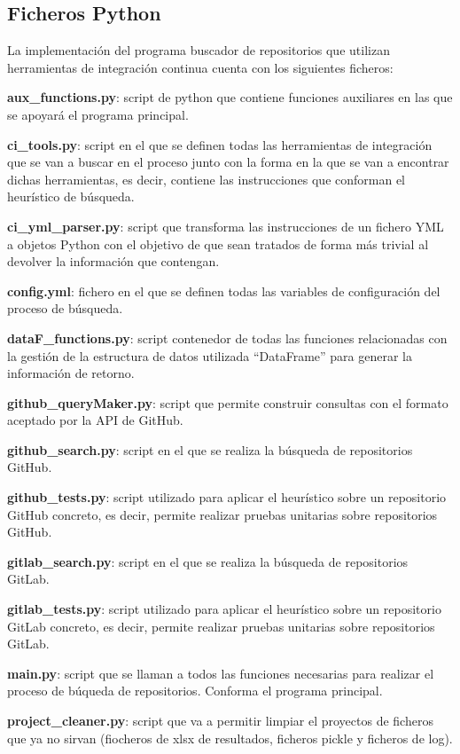 \subsection{Ficheros Python}
La implementación del programa buscador de repositorios que utilizan herramientas de integración continua cuenta con los siguientes ficheros:
\begin{compactitem}
    \item \textbf{aux\_functions.py}: script de python que contiene funciones auxiliares en las que se apoyará el programa principal.
    \item \textbf{ci\_tools.py}: script en el que se definen todas las herramientas de integración que se van a buscar en el proceso junto con la forma en la que se van a encontrar dichas herramientas, es decir, contiene las instrucciones que conforman el heurístico de búsqueda.
    \item \textbf{ci\_yml\_parser.py}: script que transforma las instrucciones de un fichero YML a objetos Python con el objetivo de que sean tratados  de forma más trivial al devolver la información que contengan.
    \item \textbf{config.yml}: fichero en el que se definen todas las variables de configuración del proceso de búsqueda.
    \item \textbf{dataF\_functions.py}: script contenedor de todas las funciones relacionadas con la gestión de la estructura de datos utilizada ``DataFrame'' para generar la información de retorno.
    \item \textbf{github\_queryMaker.py}: script que permite construir consultas con el formato aceptado por la API de GitHub.
    \item \textbf{github\_search.py}: script en el que se realiza la búsqueda de repositorios GitHub.
    \item \textbf{github\_tests.py}: script utilizado para aplicar el heurístico sobre un repositorio GitHub concreto, es decir, permite realizar pruebas unitarias sobre repositorios GitHub.
    \item \textbf{gitlab\_search.py}: script en el que se realiza la búsqueda de repositorios GitLab.
    \item \textbf{gitlab\_tests.py}: script utilizado para aplicar el heurístico sobre un repositorio GitLab concreto, es decir, permite realizar pruebas unitarias sobre repositorios GitLab.
    \item \textbf{main.py}: script que se llaman a todos las funciones necesarias para realizar el proceso de búqueda de repositorios. Conforma el programa principal.
    \item \textbf{project\_cleaner.py}: script que va a permitir limpiar el proyectos de ficheros que ya no sirvan (fiocheros de xlsx de resultados, ficheros pickle y ficheros de log).
\end{compactitem}

